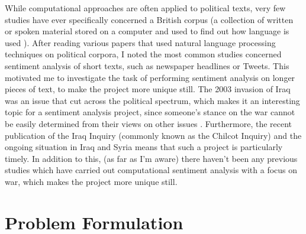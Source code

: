 \documentclass[12pt,a4paper,twoside,openright]{report}
\begin{document}
While computational approaches are often applied to political texts, very few studies have ever specifically concerned a British corpus (a collection of written or spoken material stored on a computer and used to find out how language is used \cite{corpus_definition}). After reading various papers that used natural language processing techniques on political corpora, I noted the most common studies concerned sentiment analysis of short texts, such as newspaper headlines or Tweets. This motivated me to investigate the task of performing sentiment analysis on longer pieces of text, to make the project more unique still.
\newline
\newline
The 2003 invasion of Iraq was an issue that cut across the political spectrum, which makes it an interesting topic for a sentiment analysis project, since someone's stance on the war cannot be easily determined from their views on other issues \cite{mp_votes_bbc}. Furthermore, the recent publication of the Iraq Inquiry (commonly known as the Chilcot Inquiry) \cite{chilcot2016report} and the ongoing situation in Iraq and Syria \cite{syria_iraq_air_strikes} means that such a project is particularly timely.  In addition to this, (as far as I'm aware) there haven't been any previous studies which have carried out computational sentiment analysis with a focus on war, which makes the project more unique still.


\section{Problem Formulation} \label{intro-challenges}
\end{document}
